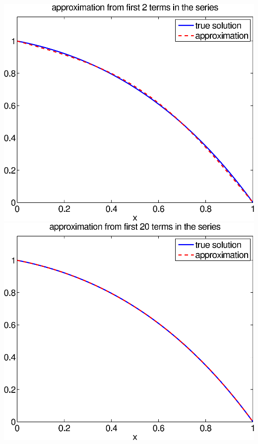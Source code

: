 {\begin{solution}
\begin{enumerate}
\begin{center}
   \includegraphics[scale=0.4]{bvps1_2}\quad
   \includegraphics[scale=0.4]{bvps1_20}
\end{center}




\end{enumerate}
\end{solution}}
